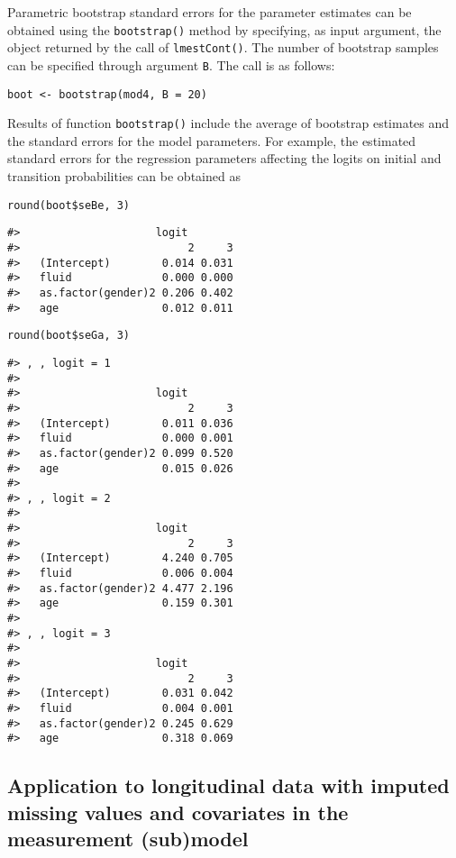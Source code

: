 Parametric bootstrap standard errors for the parameter estimates can be
obtained using the \texttt{bootstrap()} method by specifying, as input
argument, the object returned by the call of \texttt{lmestCont()}. The number
of bootstrap samples can be specified through argument \texttt{B}. The call is
as follows:

\begin{verbatim}
boot <- bootstrap(mod4, B = 20)
\end{verbatim}

Results of function \texttt{bootstrap()} include the average of bootstrap
estimates and the standard errors for the model parameters. For example,
the estimated standard errors for the regression parameters affecting
the logits on initial and transition probabilities can be obtained as

\begin{verbatim}
round(boot$seBe, 3)
\end{verbatim}

\begin{verbatim}
#>                     logit
#>                          2     3
#>   (Intercept)        0.014 0.031
#>   fluid              0.000 0.000
#>   as.factor(gender)2 0.206 0.402
#>   age                0.012 0.011
\end{verbatim}

\begin{verbatim}
round(boot$seGa, 3)
\end{verbatim}

\begin{verbatim}
#> , , logit = 1
#> 
#>                     logit
#>                          2     3
#>   (Intercept)        0.011 0.036
#>   fluid              0.000 0.001
#>   as.factor(gender)2 0.099 0.520
#>   age                0.015 0.026
#> 
#> , , logit = 2
#> 
#>                     logit
#>                          2     3
#>   (Intercept)        4.240 0.705
#>   fluid              0.006 0.004
#>   as.factor(gender)2 4.477 2.196
#>   age                0.159 0.301
#> 
#> , , logit = 3
#> 
#>                     logit
#>                          2     3
#>   (Intercept)        0.031 0.042
#>   fluid              0.004 0.001
#>   as.factor(gender)2 0.245 0.629
#>   age                0.318 0.069
\end{verbatim}

\hypertarget{subsec:HMcontapp3}{%
\subsection{Application to longitudinal data with imputed missing values and covariates in the measurement (sub)model}\label{subsec:HMcontapp3}}

